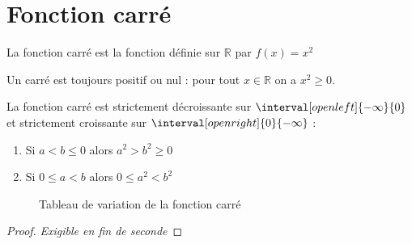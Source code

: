 \documentclass[main.tex]{subfiles}
\begin{document}
\section{Fonction carré}   
\begin{definition}
	La fonction carré est  la fonction définie sur $\mathbb{R} $ par $f(x)=x^2$ 
\end{definition}
Un carré est toujours positif ou nul : pour tout $x\in\mathbb{R}$ on a $x^2 \geqslant 0$.
\begin{proposition}  
	La fonction carré  est strictement décroissante sur $\interval[open left]{-\infty}{0}$  et strictement croissante sur  $\interval[open right]{0}{-\infty}$ :  
	\begin{enumerate}[label=\textbullet]
		\item  Si $a<b\leqslant 0$ alors $a^2>b^2\geqslant 0$
		\item Si $0\leqslant  a<b$ alors $0\leqslant   a^2<b^2$
	\end{enumerate}
\end{proposition}
\begin{figure}[h]
	\caption{Tableau de variation de la fonction carré} 
\end{figure} 
\begin{proof}\emph{Exigible en fin de seconde}\hfill 
	\vfill 
\end{proof}  
\end{document}
